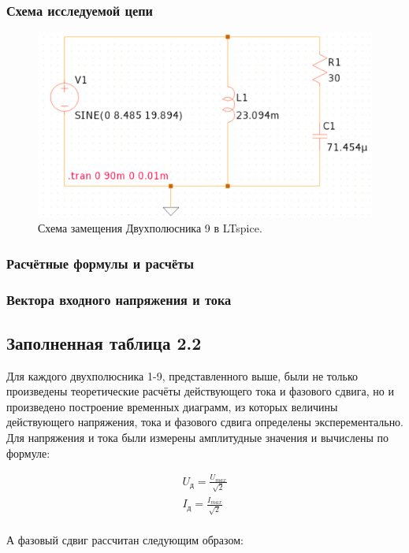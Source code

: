 \subsubsection{Схема исследуемой цепи}
\begin{figure}[H]
	\centering
	\includegraphics[width=1\textwidth]{./data/schema9}
	\caption{Схема замещения Двухполюсника 9 в LTspice.}
\end{figure}
\subsubsection{Расчётные формулы и расчёты}

\subsubsection{Вектора входного напряжения и тока}


\subsection{Заполненная таблица 2.2}
Для каждого двухполюсника 1-9, представленного выше, были не только произведены теоретические расчёты действующего тока и фазового сдвига, но и произведено построение временных диаграмм, из которых величины действующего напряжения, тока и фазового сдвига определены эксперементально. Для напряжения и тока были измерены амплитудные значения и вычислены по формуле:

\[
	\begin{gathered}
		U_{\text{д}} = \frac{U_{max}}{\sqrt{2}} \\
		I_{\text{д}} = \frac{I_{max}}{\sqrt{2}} \\
	\end{gathered}
\]

А фазовый сдвиг рассчитан следующим образом:

